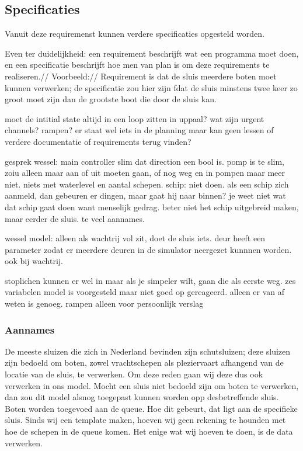 \documentclass{article}
\begin{document}
	
	\subsection{Specificaties}
	Vanuit deze requiremenst kunnen verdere specificaties opgesteld worden.
	
	Even ter duidelijkheid: een requirement beschrijft wat een programma moet doen, en een specificatie beschrijft hoe men van plan is om deze requirements te realiseren.//
	Voorbeeld:// Requirement is dat de sluis meerdere boten moet kunnen verwerken; de specificatie zou hier zijn fdat de sluis minstens twee keer zo groot moet zijn dan de grootste boot die door de sluis kan.
	
		
	moet de intitial state altijd in een loop zitten in uppaal?
	wat zijn urgent channels?
	rampen? er staat wel iets in de planning maar kan geen lessen of verdere documentatie of requirements terug vinden?	
	
	
	gesprek wessel:
	main controller slim dat direction een bool is. 
	pomp is te slim, zoiu alleen maar aan of uit moeten gaan, of nog weg en in pompen maar meer niet. niets met waterlevel en aantal schepen.
	schip: niet doen. als een schip zich aanmeld, dan gebeuren er dingen, maar gaat hij naar binnen? je weet niet wat dat schip gaat doen want menselijk gedrag. beter niet het schip uitgebreid maken, maar eerder de sluis. te veel aannames.
	
	wessel model: alleen als wachtrij vol zit, doet de sluis iets.
	deur heeft een parameter zodat er meerdere deuren in de simulator neergezet kunnnen worden. ook bij wachtrij.
	
	stoplichen kunnen er wel in maar als je simpeler wilt, gaan die als eerste weg.
	zes variabelen model is voorgesteld maar niet goed op gereageerd. alleen er van af weten is genoeg.
	rampen alleen voor persoonlijk verslag
	
	\subsubsection{Aannames}
	
		De meeste sluizen die zich in Nederland bevinden zijn schutsluizen; deze sluizen zijn bedoeld om boten, zowel vrachtschepen als pleziervaart afhangend van de locatie van de sluis, te verwerken. Om deze reden gaan wij deze dus ook verwerken in ons model. Mocht een sluis niet bedoeld zijn om boten te verwerken, dan zou dit model alsnog toegepast kunnen worden opp desbetreffende sluis.
	Boten worden toegevoed aan de queue. Hoe dit gebeurt, dat ligt aan de specifieke sluis.  Sinds wij een template maken, hoeven wij geen rekening te hounden met hoe de schepen in de queue komen. Het enige wat wij hoeven te doen, is de data verwerken.
	
\end{document}
